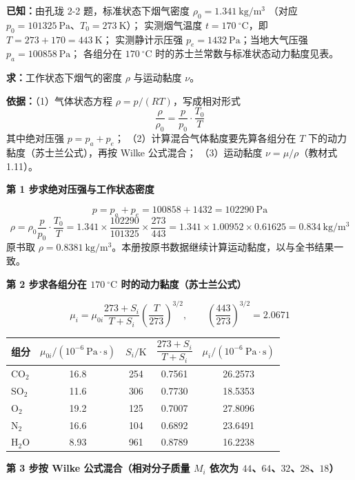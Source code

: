 \begin{jie}
\textbf{已知：}由孔珑 2-2 题，标准状态下烟气密度 $\rho_0=1.341\ \mathrm{kg/m^3}$
（对应 $p_0=101325\ \mathrm{Pa}$、$T_0=273\ \mathrm{K}$）；
实测烟气温度 $t=170\ ^{\circ}\mathrm{C}$，即 $T=273+170=443\ \mathrm{K}$；
实测静计示压强 $p_e=1432\ \mathrm{Pa}$；当地大气压强 $p_a=100858\ \mathrm{Pa}$；
各组分在 $170\ ^{\circ}\mathrm{C}$ 时的苏士兰常数与标准状态动力黏度见表。

\textbf{求：}工作状态下烟气的密度 $\rho$ 与运动黏度 $\nu$。

\textbf{依据：}（1）气体状态方程 $\rho=p/(RT)$，写成相对形式
\[ \frac{\rho}{\rho_0}=\frac{p}{p_0}\cdot\frac{T_0}{T} \]
其中绝对压强 $p=p_a+p_e$；
（2）计算混合气体黏度要先算各组分在 $T$ 下的动力黏度（苏士兰公式），再按 Wilke 公式混合；
（3）运动黏度 $\nu=\mu/\rho$（教材式 1.11）。

\textbf{第 1 步\quad 求绝对压强与工作状态密度}

\[ p=p_a+p_e=100858+1432=102290\ \mathrm{Pa} \]
\[ \rho=\rho_0\frac{p}{p_0}\cdot\frac{T_0}{T}=1.341\times\frac{102290}{101325}\times\frac{273}{443}
        =1.341\times1.00952\times0.61625=0.834\ \mathrm{kg/m^3} \]
原书取 $\rho=0.8381\ \mathrm{kg/m^3}$。本册按原书数据继续计算运动黏度，以与全书结果一致。

\textbf{第 2 步\quad 求各组分在 $170\ ^{\circ}\mathrm{C}$ 时的动力黏度（苏士兰公式）}

\[ \mu_i=\mu_{0i}\frac{273+S_i}{T+S_i}\left(\frac{T}{273}\right)^{3/2},\qquad
   \left(\frac{443}{273}\right)^{3/2}=2.0671 \]

\begin{center}
\begin{tabularx}{\textwidth}{@{}lcccc@{}}
\toprule
组分 & $\mu_{0i}/(10^{-6}\ \mathrm{Pa\cdot s})$ & $S_i/\mathrm{K}$ & $\dfrac{273+S_i}{T+S_i}$ & $\mu_i/(10^{-6}\ \mathrm{Pa\cdot s})$ \\
\midrule
$\mathrm{CO_2}$ & 16.8 & 254 & 0.7561 & 26.2573 \\
$\mathrm{SO_2}$ & 11.6 & 306 & 0.7730 & 18.5353 \\
$\mathrm{O_2}$   & 19.2 & 125 & 0.7007 & 27.8096 \\
$\mathrm{N_2}$   & 16.6 & 104 & 0.6892 & 23.6491 \\
$\mathrm{H_2O}$  & 8.93 & 961 & 0.8789 & 16.2238 \\
\bottomrule
\end{tabularx}
\end{center}

\textbf{第 3 步\quad 按 Wilke 公式混合（相对分子质量 $M_i$ 依次为 $44$、$64$、$32$、$28$、$18$）}


\end{jie}
